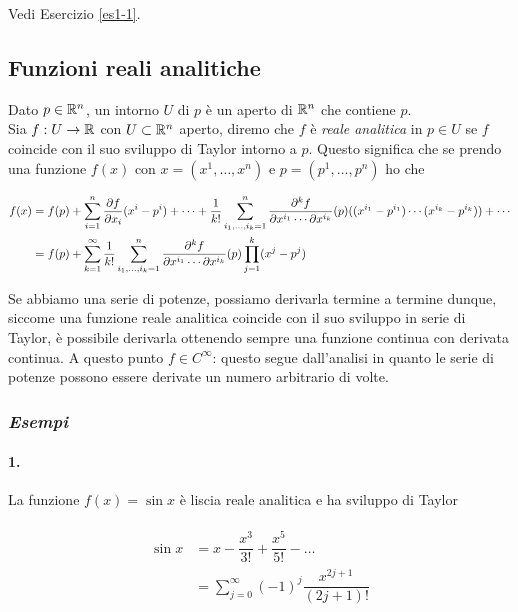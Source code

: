 Vedi Esercizio \ref{es1-1}.

\subsection{Funzioni reali analitiche}

Dato $ p \in \mathbb{R}^{n} $, un intorno $ U $ di $ p $ è un aperto di $ \mathbb{R}^{n} $ che contiene $ p $.\\
Sia $ f : U \to \mathbb{R} $ con $ U \subset \mathbb{R}^{n} $ aperto, diremo che $ f $ è \textit{reale analitica} in $ p \in U $ se $ f $ coincide con il suo sviluppo di Taylor intorno a $ p $. Questo significa che se prendo una funzione $ f (x) $ con $ x = (x^{1}, \dots, x^{n}) $ e $ p = (p^{1}, \dots, p^{n}) $ ho che

\begin{align}
	\begin{split}
		f (x) &= f (p) + \sum_{i=1}^{n} \pdv{f}{x_{i}} (p) (x^{i} - p^{i}) + \cdots + \dfrac{1}{k!} \sum_{i_{1},\dots,i_{k}=1}^{n} \dfrac{\partial^{k} f}{\partial x^{i_{1}} \cdots \partial x^{i_{k}}} (p) ( (x^{i_{1}} - p^{i_{1}}) \cdots (x^{i_{k}} - p^{i_{k}}) ) + \cdots\\
		&= f (p) + \sum_{k=1}^{\infty} \dfrac{1}{k!} \sum_{i_{1},\dots,i_{k}=1}^{n} \dfrac{\partial^{k} f}{\partial x^{i_{1}} \cdots \partial x^{i_{k}}} (p) \prod_{j=1}^{k} (x^{j} - p^{j})
	\end{split}
\end{align}

Se abbiamo una serie di potenze, possiamo derivarla termine a termine dunque, siccome una funzione reale analitica coincide con il suo sviluppo in serie di Taylor, è possibile derivarla ottenendo sempre una funzione continua con derivata continua. A questo punto $ f \in C^{\infty} $: questo segue dall'analisi in quanto le serie di potenze possono essere derivate un numero arbitrario di volte.

\subsubsection{\textit{Esempi}}

\paragraph{1.}

La funzione $ f (x) = \sin x $ è liscia reale analitica e ha sviluppo di Taylor

\begin{align}
	\begin{split}
		\sin x &= x - \dfrac{x^{3}}{3!} + \dfrac{x^{5}}{5!} - \dots\\
		&= \sum_{j=0}^{\infty} (-1)^{j} \dfrac{x^{2j+1}}{(2j+1)!}
	\end{split}
\end{align}

